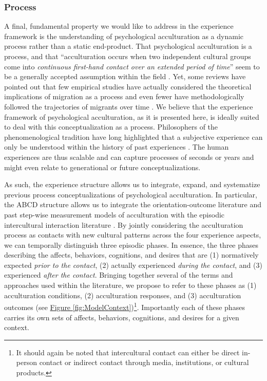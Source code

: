 \documentclass[man, 12pt, a4paper, mask]{apa7}
\newcommand{\fgrref}[2][]{\hyperref[#2]{Figure \ref*{#2}#1}}
\begin{document}
\subsubsection{Process}
A final, fundamental property we would like to address in the experience framework is the understanding of psychological acculturation as a dynamic process rather than a static end-product. That psychological acculturation is a process, and that ``acculturation occurs when two independent cultural groups come into \textit{continuous first-hand contact over an extended period of time}'' \citep[][186]{Berry1989} seem to be a generally accepted assumption within the field \citep[e.g.,][]{Ward2016}. Yet, some reviews have pointed out that few empirical studies have actually considered the theoretical implications of migration as a process and even fewer have methodologically followed the trajectories of migrants over time \citep[][]{Brown2011, Ward2019}. We believe that the experience framework of psychological acculturation, as it is presented here, is ideally suited to deal with this conceptualization as a process. Philosophers of the phenomenological tradition have long highlighted that a subjective experience can only be understood within the history of past experiences \citep[e.g.,][]{Heidegger1978}. The human experiences are thus scalable and can capture processes of seconds or years and might even relate to generational or future conceptualizations.

As such, the experience structure allows us to integrate, expand, and systematize previous process conceptualizations of psychological acculturation. In particular, the ABCD structure allows us to integrate the orientation-outcome literature \citep[][]{TeLindert2008a} and past step-wise measurement models of acculturation \citep[][]{Arends-Toth2006a} with the episodic intercultural interaction literature \citep[][]{Maertz2016}. By jointly considering the acculturation process as contacts with new cultural patterns across the four experience aspects, we can temporally distinguish three episodic phases. In essence, the three phases describing the affects, behaviors, cognitions, and desires that are (1) normatively expected \textit{prior to the contact}, (2) actually experienced \textit{during the contact}, and (3) experienced \textit{after the contact}. Bringing together several of the terms and approaches used within the literature, we propose to refer to these phases as (1) acculturation conditions, (2) acculturation responses, and (3) acculturation outcomes (see \fgrref{fig:ModelContext})\footnote{It should again be noted that intercultural contact can either be direct in-person contact or indirect contact through media, institutions, or cultural products.}. Importantly each of these phases carries its own sets of affects, behaviors, cognitions, and desires for a given context. 
\end{document}
